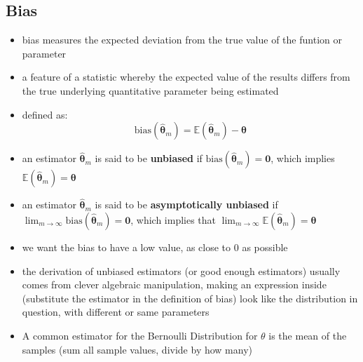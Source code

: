 \documentclass[11pt, twocolumn]{report}
\def\expectation{\mathbb{E}}
\def\statistic{\hat{\bm{\theta}}}
\def\parameter{\bm{\theta}}
\begin{document}
\subsection{Bias}
\begin{itemize}
  \item bias measures the expected deviation from the true value of the funtion
    or parameter
  \item a feature of a statistic whereby the expected value of the results
    differs from the true underlying quantitative parameter being estimated
  \item defined as:
    \begin{equation}
      \text{bias}(\statistic_m) = \expectation{(\statistic_m)} - \parameter
    \end{equation}
  \item an estimator $\statistic_m$ is said to be \textbf{unbiased} if
    $\text{bias}(\statistic_m) = \bm{0}$, which implies
    $\expectation{(\statistic_m)} = \parameter$
  \item an estimator $\statistic_m$ is said to be \textbf{asymptotically
      unbiased} if $\lim_{m \to \infty} \text{bias}(\statistic_m) = \bm{0}$,
    which implies that $\lim_{m \to \infty} \expectation{(\statistic_m)} =
    \parameter$
  \item we want the bias to have a low value, as close to 0 as possible
  \item the derivation of unbiased estimators (or good enough estimators)
    usually comes from clever algebraic manipulation, making an expression
    inside (substitute the estimator in the definition of bias) look like the
    distribution in question, with different or same parameters
  \item A common estimator for the Bernoulli Distribution for $\theta$ is the
    mean of the samples (sum all sample values, divide by how many)
\end{itemize}
\end{document}
